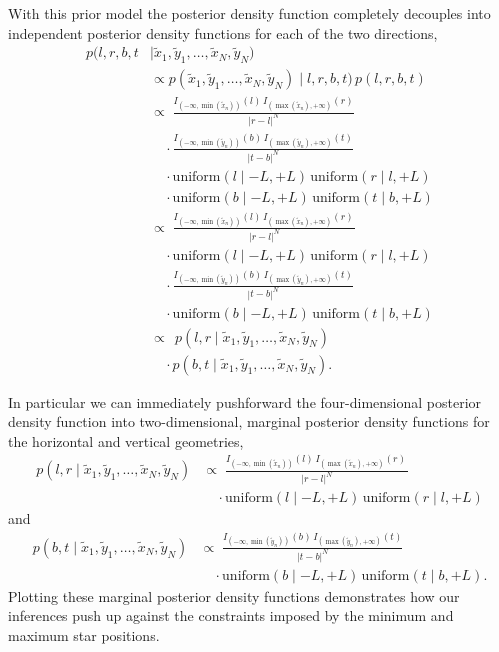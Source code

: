 \documentclass[
  letterpaper,
  DIV=11,
  numbers=noendperiod]{scrartcl}
\begin{document}
With this prior model the posterior density function completely
decouples into independent posterior density functions for each of the
two directions, \begin{align*}
p(l, r, b, t &\mid
  \tilde{x}_{1}, \tilde{y}_{1}, \ldots, \tilde{x}_{N}, \tilde{y}_{N})
\\
&\propto
p(\tilde{x}_{1}, \tilde{y}_{1}, \ldots, \tilde{x}_{N}, \tilde{y}_{N}) \mid
  l, r, b, t) \,
p(l, r, b, t)
\\
&\propto \;
\frac{
  I_{ (-\infty, \min(\tilde{x}_{n})) }(l) \,
  I_{ (\max(\tilde{x}_{n}), +\infty) }(r)
}
{
  | r - l |^{N}
} \,
\\
&\quad \cdot
\frac{
  I_{ (-\infty, \min(\tilde{y}_{n})) }(b) \,
  I_{ (\max(\tilde{y}_{n}), +\infty) }(t)
}
{
  | t - b |^{N}
} \,
\\
&\quad \cdot
\text{uniform}(l \mid -L, +L) \, \text{uniform}(r \mid l, +L)
\\
&\quad \cdot
\text{uniform}(b \mid -L, +L) \, \text{uniform}(t \mid b, +L)
\\
&\propto \;
\frac{
  I_{ (-\infty, \min(\tilde{x}_{n})) }(l) \,
  I_{ (\max(\tilde{x}_{n}), +\infty) }(r) \,
}
{ | r - l |^{N} }
\\
&\quad \cdot
\text{uniform}(l \mid -L, +L) \, \text{uniform}(r \mid l, +L)
\\
&\quad \cdot
\frac{
  I_{ (-\infty, \min(\tilde{y}_{n})) }(b) \,
  I_{ (\max(\tilde{y}_{n}), +\infty) }(t)
}
{ | t - b |^{N} }
\\
&\quad \cdot
\text{uniform}(b \mid -L, +L) \, \text{uniform}(t \mid b, +L)
\\
&\propto \;\,
p(l, r \mid \tilde{x}_{1}, \tilde{y}_{1}, \ldots, \tilde{x}_{N}, \tilde{y}_{N})
\\
&\quad \cdot
p(b, t \mid \tilde{x}_{1}, \tilde{y}_{1}, \ldots, \tilde{x}_{N}, \tilde{y}_{N}).
\end{align*}

In particular we can immediately pushforward the four-dimensional
posterior density function into two-dimensional, marginal posterior
density functions for the horizontal and vertical geometries,
\begin{align*}
p(l, r \mid \tilde{x}_{1}, \tilde{y}_{1}, \ldots, \tilde{x}_{N}, \tilde{y}_{N})
&\propto \;
\frac{
  I_{ (-\infty, \min(\tilde{x}_{n})) }(l) \,
  I_{ (\max(\tilde{x}_{n}), +\infty) }(r) \,
}
{ | r - l |^{N} }
\\
&\quad \cdot
\text{uniform}(l \mid -L, +L) \, \text{uniform}(r \mid l, +L)
\end{align*} and \begin{align*}
p(b, t \mid \tilde{x}_{1}, \tilde{y}_{1}, \ldots, \tilde{x}_{N}, \tilde{y}_{N})
&\propto \;
\frac{
  I_{ (-\infty, \min(\tilde{y}_{n})) }(b) \,
  I_{ (\max(\tilde{y}_{n}), +\infty) }(t)
}
{ | t - b |^{N} }
\\
&\quad \cdot
\text{uniform}(b \mid -L, +L) \, \text{uniform}(t \mid b, +L).
\end{align*} Plotting these marginal posterior density functions
demonstrates how our inferences push up against the constraints imposed
by the minimum and maximum star positions.
\end{document}
